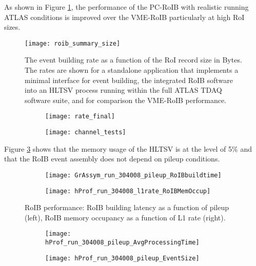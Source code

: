 

As shown in Figure \ref{fig:roib_summary}, the performance of the PC-RoIB with realistic running ATLAS conditions
is improved over the VME-RoIB particularly at high RoI sizes. 

\begin{figure}[t!]
\centering
\texttt{[image: roib\_summary\_size]} 
\caption{The event building rate as a function of the RoI record size in Bytes. The rates are shown for a standalone application that implements 
a minimal interface for event building, the integrated RoIB software into an HLTSV process
running within the full ATLAS TDAQ software suite, and for comparison the VME-RoIB performance.}
\label{fig:roib_summary}
\end{figure} 

\begin{figure}[p!]
\centering
 \begin{subfigure}{0.48\textwidth}
 \texttt{[image: rate\_final]}
 \subcaption{}
 \end{subfigure}
 \begin{subfigure}{0.48\textwidth}
 \texttt{[image: channel\_tests]}
 \subcaption{}
 \end{subfigure}
   \caption{
}
\label{fig:roib.perf.other}
\end{figure}

Figure \ref{fig:roib_pileup_l1rate} shows that the memory usage of the HLTSV is at the level of 5\% and that the RoIB event assembly does not depend 
on pileup conditions.


\begin{figure}[t!]
\centering
\begin{subfigure}[t]{0.48\textwidth}
\texttt{[image: GrAssym\_run\_304008\_pileup\_RoIBbuildtime]}
\end{subfigure}
\begin{subfigure}[t]{0.48\textwidth}
\texttt{[image: hProf\_run\_304008\_l1rate\_RoIBMemOccup]}
\end{subfigure}
\vspace{-0.25cm}
\caption{RoIB performance: RoIB building latency as a function of pileup (left), RoIB memory occupancy as a function of L1 rate (right).}
\label{fig:roib_pileup_l1rate}
\end{figure} 




\begin{figure}[t!]
\centering
\begin{subfigure}[t]{0.48\textwidth}
\texttt{[image: hProf\_run\_304008\_pileup\_AvgProcessingTime]}
\end{subfigure}
\begin{subfigure}[t]{0.48\textwidth}
\texttt{[image: hProf\_run\_304008\_pileup\_EventSize]}
\end{subfigure}
\vspace{-0.25cm}
\caption{}
\label{fig:}
\end{figure} 
